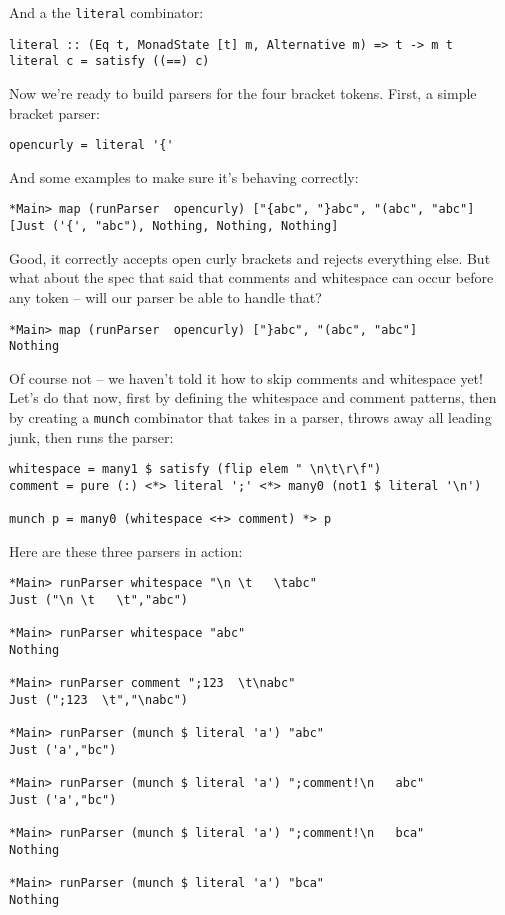 \documentclass{tmr}
\begin{document}
And a the \verb+literal+ combinator:
\begin{verbatim}
literal :: (Eq t, MonadState [t] m, Alternative m) => t -> m t
literal c = satisfy ((==) c)
\end{verbatim}

Now we're ready to build parsers for the four bracket tokens.  
First, a simple bracket parser:
\begin{verbatim}
opencurly = literal '{'
\end{verbatim}

And some examples to make sure it's behaving correctly:
\begin{verbatim}
*Main> map (runParser  opencurly) ["{abc", "}abc", "(abc", "abc"]
[Just ('{', "abc"), Nothing, Nothing, Nothing]
\end{verbatim}

Good, it correctly accepts open curly brackets and rejects everything else.
But what about the spec that said that comments and whitespace can occur 
before any token -- will our parser be able to handle that?
\begin{verbatim}
*Main> map (runParser  opencurly) ["}abc", "(abc", "abc"]
Nothing
\end{verbatim}

Of course not -- we haven't told it how to skip comments and whitespace yet!
Let's do that now, first by defining the whitespace and comment patterns, then
by creating a \verb+munch+ combinator that takes in a parser, 
throws away all leading junk, then runs the parser:
\begin{verbatim}
whitespace = many1 $ satisfy (flip elem " \n\t\r\f")
comment = pure (:) <*> literal ';' <*> many0 (not1 $ literal '\n')

munch p = many0 (whitespace <+> comment) *> p
\end{verbatim}

Here are these three parsers in action:
\begin{verbatim}
*Main> runParser whitespace "\n \t   \tabc"
Just ("\n \t   \t","abc")

*Main> runParser whitespace "abc"
Nothing

*Main> runParser comment ";123  \t\nabc"
Just (";123  \t","\nabc")

*Main> runParser (munch $ literal 'a') "abc"
Just ('a',"bc")

*Main> runParser (munch $ literal 'a') ";comment!\n   abc"
Just ('a',"bc")

*Main> runParser (munch $ literal 'a') ";comment!\n   bca"
Nothing

*Main> runParser (munch $ literal 'a') "bca"
Nothing
\end{verbatim}
\end{document}
